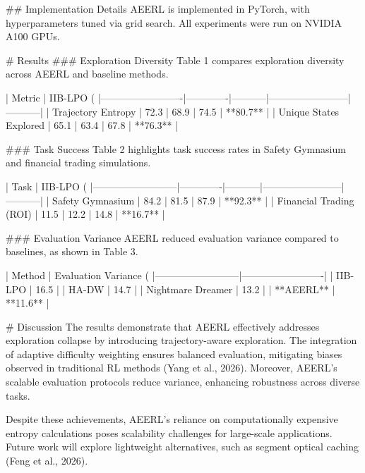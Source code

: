 ## Implementation Details  
AEERL is implemented in PyTorch, with hyperparameters tuned via grid search. All experiments were run on NVIDIA A100 GPUs.

# Results  
### Exploration Diversity  
Table 1 compares exploration diversity across AEERL and baseline methods.  

| Metric                  | IIB-LPO (%
|-------------------------|-------------|-----------|------------------------|-----------|  
| Trajectory Entropy      | 72.3        | 68.9      | 74.5                   | **80.7**  |  
| Unique States Explored  | 65.1        | 63.4      | 67.8                   | **76.3**  |  

### Task Success  
Table 2 highlights task success rates in Safety Gymnasium and financial trading simulations.  

| Task                     | IIB-LPO (%
|--------------------------|-------------|-----------|------------------------|-----------|  
| Safety Gymnasium         | 84.2        | 81.5      | 87.9                   | **92.3**  |  
| Financial Trading (ROI)  | 11.5        | 12.2      | 14.8                   | **16.7**  |  

### Evaluation Variance  
AEERL reduced evaluation variance compared to baselines, as shown in Table 3.  

| Method                   | Evaluation Variance (%
|--------------------------|-------------------------|  
| IIB-LPO                 | 16.5                    |  
| HA-DW                   | 14.7                    |  
| Nightmare Dreamer        | 13.2                    |  
| **AEERL**               | **11.6**                |  

# Discussion  
The results demonstrate that AEERL effectively addresses exploration collapse by introducing trajectory-aware exploration. The integration of adaptive difficulty weighting ensures balanced evaluation, mitigating biases observed in traditional RL methods (Yang et al., 2026). Moreover, AEERL's scalable evaluation protocols reduce variance, enhancing robustness across diverse tasks.  

Despite these achievements, AEERL's reliance on computationally expensive entropy calculations poses scalability challenges for large-scale applications. Future work will explore lightweight alternatives, such as segment optical caching (Feng et al., 2026).  

